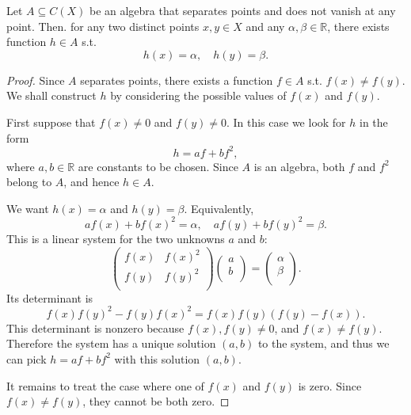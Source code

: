 \begin{lemma} \label{lm: separate points and no vanish is stronger}
    Let \(A \subseteq C(X)\) be an algebra that separates points and does not vanish at any point. Then. for any two distinct points \(x, y \in X\) and any \(\alpha , \beta \in \mathbb{R} \), there exists function \(h \in A\) s.t. 
    \[
        h(x) = \alpha, \quad h(y) = \beta.
    \]    
\end{lemma}

\begin{proof}
    Since \(A\) separates points, there exists a function \(f \in A\) s.t. \(f(x) \neq f(y)\). We shall construct \(h\) by considering the possible values of \(f(x)\) and \(f(y)\). 

    First suppose that \(f(x) \neq 0\) and \(f(y) \neq 0\). In this case we look for \(h\) in the form
    \[
        h = af + bf^2,
    \]         
    where \(a, b \in \mathbb{R}\) are constants to be chosen. Since \(A\) is an algebra, both \(f\) and \(f^2\) belong to \(A\), and hence \(h \in A\). 

    We want \(h(x) = \alpha\) and \(h(y) = \beta\). Equivalently,
    \[
        a f(x) + b f(x)^2 = \alpha, \quad a f(y) + b f(y)^2 = \beta.
    \]        
    This is a linear system for the two unknowns \(a\) and \(b\):
    \[
        \begin{pmatrix}
            f(x) & f(x)^2   \\
            f(y) & f(y)^2  \\
        \end{pmatrix} 
        \begin{pmatrix}
             a \\
             b \\
        \end{pmatrix} = 
        \begin{pmatrix}
             \alpha \\
             \beta \\
        \end{pmatrix}.
    \]  
    Its determinant is 
    \[
        f(x) f(y)^2 - f(y) f(x)^2 = f(x) f(y) (f(y) - f(x)).
    \]
    This determinant is nonzero because \(f(x), f(y) \neq 0\), and \(f(x) \neq f(y)\). Therefore the system has a unique solution \((a, b)\) to the system, and thus we can pick \(h = af + bf^2\) with this solution \((a, b)\). 

    It remains to treat the case where one of \(f(x)\) and \(f(y)\) is zero. Since \(f(x) \neq f(y)\), they cannot be both zero. 


\end{proof}

